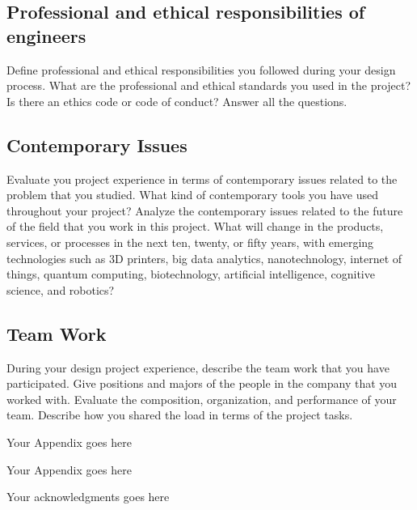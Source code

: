 \documentclass{mefsdp}
\begin{document}
	\subsection{Professional and ethical responsibilities of engineers}
	Define professional and ethical responsibilities you followed during your design process. What are the professional and ethical standards you used in the project? Is there an ethics code or code of conduct? Answer all the questions.
	
	\subsection{Contemporary Issues}
	Evaluate you project experience in terms of contemporary issues related to the problem that you studied. What kind of contemporary tools you have used throughout your project? Analyze the contemporary issues related to the future of the field that you work in this project. What will change in the products, services, or processes in the next ten, twenty, or fifty years, with emerging technologies such as 3D printers, big data analytics, nanotechnology, internet of things, quantum computing, biotechnology, artificial intelligence, cognitive science, and robotics?
	
	\subsection{Team Work}
	During your design project experience, describe the team work that you have participated. Give positions and majors of the people in the company that you worked with. Evaluate the composition, organization, and performance of your team. Describe how you shared the load in terms of the project tasks. 
	
	\begin{appendix}[A]
		Your Appendix goes here
	\end{appendix}

	\begin{appendix}[B]
		Your Appendix goes here
	\end{appendix}
	
	\begin{acknowledgments}
		Your acknowledgments goes here
	\end{acknowledgments}
	
	
	
\end{document}
